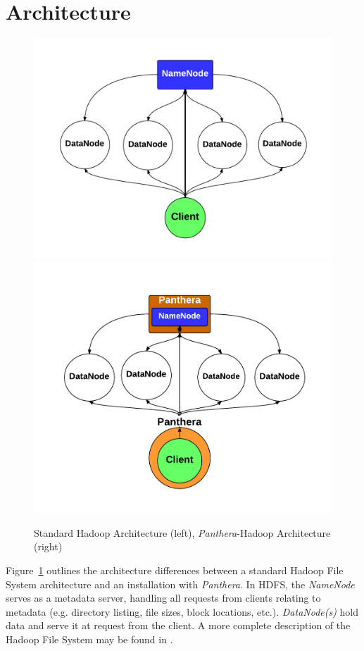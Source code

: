 \documentclass[12pt]{article}
\begin{document}
\section{Architecture}
\begin{figure}[!h]
	\centering
	\includegraphics[scale=0.4]{assets/hadoop_architecture.pdf}
	\includegraphics[scale=0.4]{assets/panthera_architecture.pdf}
  \caption{Standard Hadoop Architecture (left), \textit{Panthera}-Hadoop Architecture (right)}
  \label{arch}
  
\end{figure}

Figure~\ref{arch} outlines the architecture differences between a standard Hadoop File System architecture and an installation with \textit{Panthera}. In HDFS, the \textit{NameNode} serves as a metadata server, handling all requests from clients relating to metadata (e.g. directory listing, file sizes, block locations, etc.). \textit{DataNode(s)} hold data and serve it at request from the client. A more complete description of the Hadoop File System may be found in \cite{hadoop}.
\end{document}
